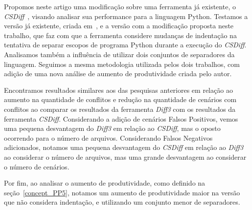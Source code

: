 Propomos neste artigo uma modificação sobre uma ferramenta já existente, o
\emph{CSDiff}~\cite{clem21}, visando analisar sua performance para a linguagem
Python. Testamos a versão já existente, criada em~\cite{heitor21}, e a versão
com a modificação proposta neste trabalho, que faz com que a ferramenta
considere mudanças de indentação na tentativa de separar escopos de programa
Python durante a execução do \emph{CSDiff}. Analisamos também a influência de
utilizar dois conjuntos de separadores da linguagem. Seguimos a mesma
metodologia utilizada pelos dois trabalhos, com adição de uma nova análise de
aumento de produtividade criada pelo autor.

Encontramos resultados similares aos das pesquisas anteriores em relação ao
aumento na quantidade de conflitos e redução na quantidade de cenários com
conflitos ao comparar os resultados da ferramenta \emph{Diff3} com os
resultados da ferramenta \emph{CSDiff}. Considerando a adição de cenários
Falsos Positivos, vemos uma pequena desvantagem do \emph{Diff3} em relação ao
\emph{CSDiff}, mas o oposto ocorrendo para o número de arquivos. Considerando
Falsos Negativos adicionados, notamos uma pequena desvantagem do \emph{CSDiff}
em relação ao \emph{Diff3} ao considerar o número de arquivos, mas uma grande
desvantagem ao considerar o número de cenários.

Por fim, ao analisar o aumento de produtividade, como definido na
seção~\ref{concept_PP5}, notamos um aumento de produtividade maior na versão
que não considera indentação, e utilizando um conjunto menor de separadores.


